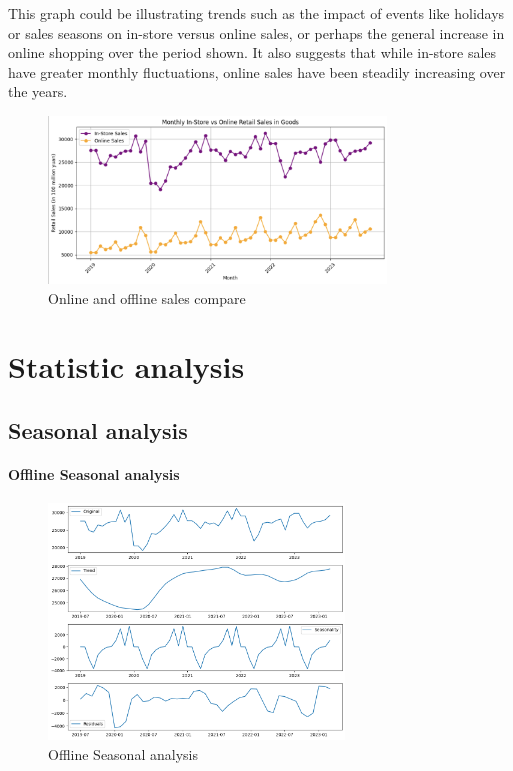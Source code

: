 \documentclass{article}
\begin{document}
This graph could be illustrating trends such as the impact of events like holidays or sales seasons on in-store versus online sales, or perhaps the general increase in online shopping over the period shown. It also suggests that while in-store sales have greater monthly fluctuations, online sales have been steadily increasing over the years.
\begin{figure}[h]
  \centering
  \includegraphics[width=0.8\textwidth]{online_offline_Compare.png}
  \caption{Online and offline sales compare}
  \label{fig:yourlabel}
\end{figure}


\section{Statistic analysis}
\subsection{Seasonal analysis}
\paragraph{Offline Seasonal analysis}
\begin{figure}[h]
  \centering
  \includegraphics[width=0.7\textwidth]{Seasonal_analysis_offline.png}
  \caption{Offline Seasonal analysis}
  \label{fig:yourlabel}
\end{figure}
\end{document}

